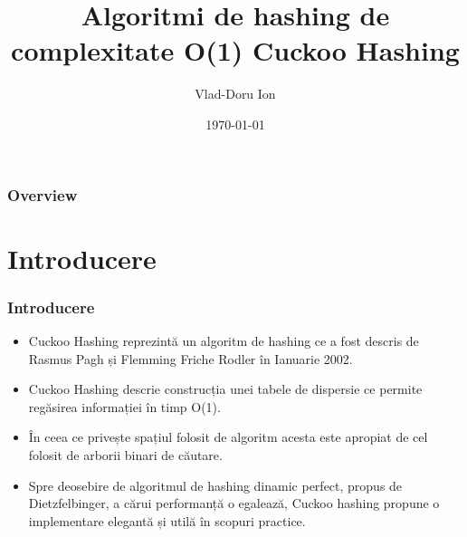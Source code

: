 \documentclass{beamer}
\title[Cuckoo Hashing]{Algoritmi de hashing de complexitate O(1) Cuckoo Hashing} %
\author{Vlad-Doru Ion} %
\institute[UNIBUC] %
{
Universitatea din București \\ %
\medskip
}
\date{\today} %
\begin{document}
\begin{frame}
\titlepage %
\end{frame}

\begin{frame}
\frametitle{Overview} %
\tableofcontents %
\end{frame}


\section{Introducere}

\begin{frame}
\frametitle{Introducere}
\begin{itemize}
\item Cuckoo Hashing reprezintă un algoritm de hashing ce a fost descris de Rasmus Pagh și Flemming Friche Rodler în Ianuarie 2002.
\item Cuckoo Hashing descrie construcția unei tabele de dispersie ce permite regăsirea informației în timp O(1).
\item În ceea ce privește spațiul folosit de algoritm acesta este apropiat de cel folosit de arborii binari de căutare.
\item Spre deosebire de algoritmul de hashing dinamic perfect, propus de Dietzfelbinger, a cărui performanță o egalează, Cuckoo hashing propune o implementare elegantă și utilă în scopuri practice.
\end{itemize}

\end{frame}
\end{document}

